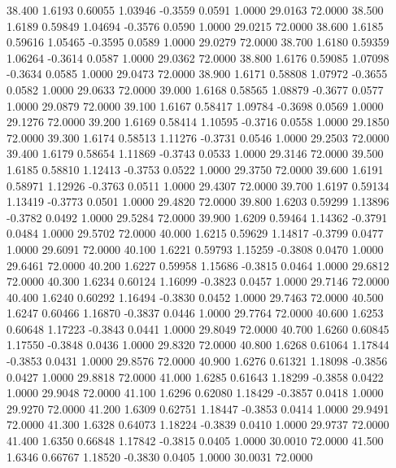   38.400   1.6193   0.60055   1.03946  -0.3559   0.0591   1.0000  29.0163  72.0000
  38.500   1.6189   0.59849   1.04694  -0.3576   0.0590   1.0000  29.0215  72.0000
  38.600   1.6185   0.59616   1.05465  -0.3595   0.0589   1.0000  29.0279  72.0000
  38.700   1.6180   0.59359   1.06264  -0.3614   0.0587   1.0000  29.0362  72.0000
  38.800   1.6176   0.59085   1.07098  -0.3634   0.0585   1.0000  29.0473  72.0000
  38.900   1.6171   0.58808   1.07972  -0.3655   0.0582   1.0000  29.0633  72.0000
  39.000   1.6168   0.58565   1.08879  -0.3677   0.0577   1.0000  29.0879  72.0000
  39.100   1.6167   0.58417   1.09784  -0.3698   0.0569   1.0000  29.1276  72.0000
  39.200   1.6169   0.58414   1.10595  -0.3716   0.0558   1.0000  29.1850  72.0000
  39.300   1.6174   0.58513   1.11276  -0.3731   0.0546   1.0000  29.2503  72.0000
  39.400   1.6179   0.58654   1.11869  -0.3743   0.0533   1.0000  29.3146  72.0000
  39.500   1.6185   0.58810   1.12413  -0.3753   0.0522   1.0000  29.3750  72.0000
  39.600   1.6191   0.58971   1.12926  -0.3763   0.0511   1.0000  29.4307  72.0000
  39.700   1.6197   0.59134   1.13419  -0.3773   0.0501   1.0000  29.4820  72.0000
  39.800   1.6203   0.59299   1.13896  -0.3782   0.0492   1.0000  29.5284  72.0000
  39.900   1.6209   0.59464   1.14362  -0.3791   0.0484   1.0000  29.5702  72.0000
  40.000   1.6215   0.59629   1.14817  -0.3799   0.0477   1.0000  29.6091  72.0000
  40.100   1.6221   0.59793   1.15259  -0.3808   0.0470   1.0000  29.6461  72.0000
  40.200   1.6227   0.59958   1.15686  -0.3815   0.0464   1.0000  29.6812  72.0000
  40.300   1.6234   0.60124   1.16099  -0.3823   0.0457   1.0000  29.7146  72.0000
  40.400   1.6240   0.60292   1.16494  -0.3830   0.0452   1.0000  29.7463  72.0000
  40.500   1.6247   0.60466   1.16870  -0.3837   0.0446   1.0000  29.7764  72.0000
  40.600   1.6253   0.60648   1.17223  -0.3843   0.0441   1.0000  29.8049  72.0000
  40.700   1.6260   0.60845   1.17550  -0.3848   0.0436   1.0000  29.8320  72.0000
  40.800   1.6268   0.61064   1.17844  -0.3853   0.0431   1.0000  29.8576  72.0000
  40.900   1.6276   0.61321   1.18098  -0.3856   0.0427   1.0000  29.8818  72.0000
  41.000   1.6285   0.61643   1.18299  -0.3858   0.0422   1.0000  29.9048  72.0000
  41.100   1.6296   0.62080   1.18429  -0.3857   0.0418   1.0000  29.9270  72.0000
  41.200   1.6309   0.62751   1.18447  -0.3853   0.0414   1.0000  29.9491  72.0000
  41.300   1.6328   0.64073   1.18224  -0.3839   0.0410   1.0000  29.9737  72.0000
  41.400   1.6350   0.66848   1.17842  -0.3815   0.0405   1.0000  30.0010  72.0000
  41.500   1.6346   0.66767   1.18520  -0.3830   0.0405   1.0000  30.0031  72.0000
